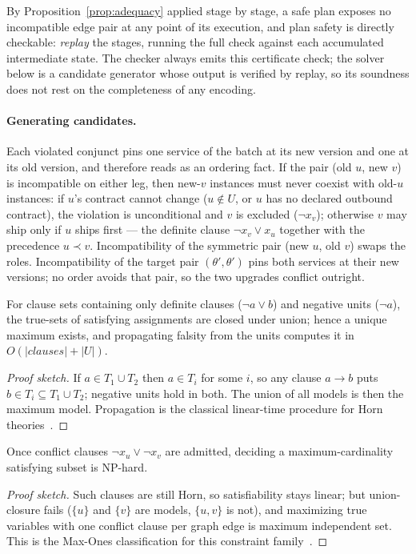 By Proposition~\ref{prop:adequacy} applied stage by stage, a safe plan
exposes no incompatible edge pair at any point of its execution, and
plan safety is directly checkable: \emph{replay} the stages, running
the full check against each accumulated intermediate state. The
checker always emits this certificate check; the solver below is a
candidate generator whose output is verified by replay, so its
soundness does not rest on the completeness of any encoding.

\paragraph{Generating candidates.}
Each violated conjunct pins one service of the batch at its new
version and one at its old version, and therefore reads as an ordering
fact. If the pair (old $u$, new $v$) is incompatible on either leg,
then new-$v$ instances must never coexist with old-$u$ instances: if
$u$'s contract cannot change ($u \notin U$, or $u$ has no declared
outbound contract), the violation is unconditional and $v$ is excluded
($\neg x_v$); otherwise $v$ may ship only if $u$ ships first --- the
definite clause $\neg x_v \vee x_u$ together with the precedence
$u \prec v$. Incompatibility of the symmetric pair (new $u$, old $v$)
swaps the roles. Incompatibility of the target pair
$(\theta',\theta')$ pins both services at their new versions; no order
avoids that pair, so the two upgrades conflict outright.

\begin{proposition}
\label{prop:easy}
For clause sets containing only definite clauses ($\neg a \vee b$) and
negative units ($\neg a$), the true-sets of satisfying assignments are
closed under union; hence a unique maximum exists, and propagating
falsity from the units computes it in $O(|\mathit{clauses}| + |U|)$.
\end{proposition}
\begin{proof}[Proof sketch]
If $a \in T_1 \cup T_2$ then $a \in T_i$ for some $i$, so any clause
$a \to b$ puts $b \in T_i \subseteq T_1 \cup T_2$; negative units hold
in both. The union of all models is then the maximum model.
Propagation is the classical linear-time procedure for Horn
theories~\cite{dowling1984linear}.
\end{proof}

\begin{proposition}
\label{prop:hard}
Once conflict clauses $\neg x_u \vee \neg x_v$ are admitted, deciding
a maximum-cardinality satisfying subset is NP-hard.
\end{proposition}
\begin{proof}[Proof sketch]
Such clauses are still Horn, so satisfiability stays linear; but
union-closure fails ($\{u\}$ and $\{v\}$ are models, $\{u,v\}$ is
not), and maximizing true variables with one conflict clause per graph
edge is maximum independent set. This is the Max-Ones classification
for this constraint family~\cite{khanna2001approximability}.
\end{proof}

